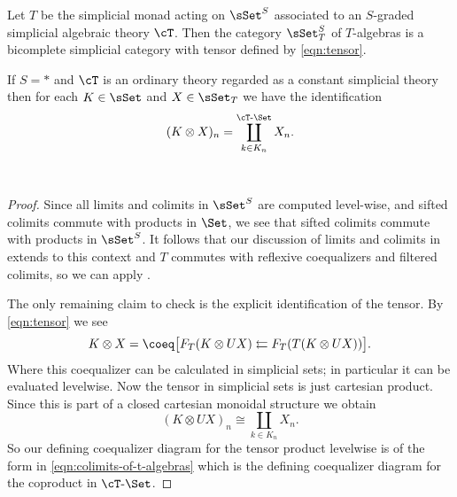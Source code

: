 \documentclass[leqno,oneside,english]{elsarticle}
\newcounter{enumisaved}
\newlength{\thmsaved}
\newlength{\thmnow}
\begin{document}
\begin{prop}\label{prop:algebraic-theories-are-simplicial-and-bicomplete}
  Let $T$ be the simplicial monad acting on $\sSet^S$ associated to an
  $S$-graded simplicial algebraic theory $\cT$. Then the category
  $\sSet^S_T$ of $T$-algebras is a bicomplete simplicial category with
  tensor defined by \eqref{eqn:tensor}. 
  
  If $S=*$ and $\cT$ is an ordinary theory regarded as a constant
  simplicial theory then for each $K\in \sSet$ and $X\in
  \sSet_T$ we have the identification 
  \[
  (K\otimes X)_n =\coprod^{{{\cT}\text{-}{\Set}}}_{k\in K_n} X_n.
  \]
\end{prop}
{{    {}  \ifshowcomplete
  \ 
  {
  \begin{proof}
  Since all limits and colimits in $\sSet^S$ are computed level-wise, and
  sifted colimits commute with products in $\Set$, we see that sifted
  colimits commute with products in $\sSet^S$. It follows that our
  discussion of limits and colimits in 
  extends to this context and $T$ commutes with reflexive coequalizers
  and filtered colimits, so we can apply
  .
  
  The only remaining claim to check is the explicit identification of the
  tensor. By \eqref{eqn:tensor} we see 
  \[ 
  K\otimes X =\coeq\big[F_T(K\otimes UX)\leftleftarrows F_T(T(K\otimes UX
  ))\big]. 
  \] 
  Where this coequalizer can be calculated in simplicial sets; in
  particular it can be evaluated levelwise. 
  Now the tensor in simplicial sets is just cartesian product. Since
  this is part of a closed cartesian monoidal structure we obtain  
  \[
  (K\otimes UX)_n \cong \coprod_{k\in K_n} X_n. 
  \]
  So our defining coequalizer diagram for the tensor product levelwise
  is of the form in \eqref{eqn:colimits-of-t-algebras} which is the
  defining coequalizer diagram for the coproduct in
  ${{\cT}\text{-}{\Set}}$.
\end{proof}
}
  {}
  \ 
  \ifthenelse{\lengthtest{\thmnow > \thmsaved}}{
    
    \setcounter{thm}{{\strip@pt{\thmsaved}}}  
  }{
    
  }
  \setcounter{enumi}{\theenumisaved}
    \else  \fi
}}{}
\end{document}
